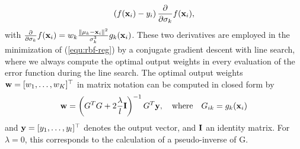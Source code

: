 \documentclass{article}
\begin{document}
\begin{appendix}
\begin{equation}
  \left(f({\bf x}_i)- y_i\right)
  \frac{\partial}{\partial \sigma_k} f({\bf x}_i), \label{equ:grad_C_sigma}
\end{equation}
with $\frac{\partial}{\partial \sigma_k}f({\bf x}_i) = w_k\frac{\|{\bf
    \mu}_k-{\bf x}_i\|^{2} }{\sigma_k^3} g_k({\bf x}_i)$.  These two derivatives are
employed in the minimization of (\ref{equ:rbf-reg}) by a conjugate gradient
descent with line search, where we always compute the optimal output weights
in every evaluation of the error function during the line search. The optimal
output weights ${\bf w}= [w_1, \ldots, w_K ]^\top$ in matrix notation can be
computed in closed form by
\begin{equation}
  \label{equ:opt_weight_vector}
  {\bf w} = \left(G^T G + 2 \frac{\lambda}{l} {\bf I} \right)^{-1} G^T {\bf y}, \quad \mbox{where} \quad G_{ik} = g_k({\bf x}_i)
\end{equation}
and ${\bf y} = [y_1 , \ldots , y_l ]^\top$ denotes the output
vector, and $\bf I$ an identity matrix. For $\lambda=0$, this
corresponds to the calculation of a pseudo-inverse of G.


\end{appendix}
\end{document}

